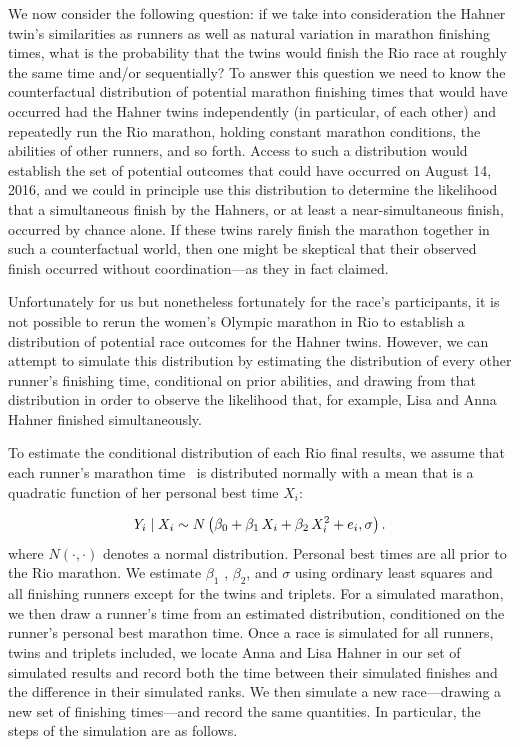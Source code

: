 \documentclass[12pt,titlepage]{article}
\begin{document}
We now consider the following question: if we take into consideration
the Hahner twin's similarities as runners as well as natural variation
in marathon finishing times, what is the probability that the twins
would finish the Rio race at roughly the same time and/or
sequentially?  To answer this question we need to know the
counterfactual distribution of potential marathon finishing times that
would have occurred had the Hahner twins independently (in particular,
of each other) and repeatedly run the Rio marathon, holding constant
marathon conditions, the abilities of other runners, and so forth.
Access to such a distribution would establish the set of potential
outcomes that could have occurred on August 14, 2016, and we could in
principle use this distribution to determine the likelihood that a
simultaneous finish by the Hahners, or at least a near-simultaneous
finish, occurred by chance alone.  If these twins rarely finish the
marathon together in such a counterfactual world, then one might be
skeptical that their observed finish occurred without
coordination---as they in fact claimed.

Unfortunately for us but nonetheless fortunately for the race's
participants, it is not possible to rerun the women's Olympic marathon
in Rio to establish a distribution of potential race outcomes for the
Hahner twins.  However, we can attempt to simulate this distribution
by estimating the distribution of every other runner's finishing time,
conditional on prior abilities, and drawing from that distribution in
order to observe the likelihood that, for example, Lisa and Anna
Hahner finished simultaneously.

To estimate the conditional distribution of each Rio final results, we
assume that each runner's marathon time \Yi\ is distributed normally
with a mean that is a quadratic function of her personal best time
$X_i$:

$$Y_i \mid X_i \sim N\left(\beta_0 + \beta_1\,X_{i} + \beta_2\,X^2_{i}  + e_i, \sigma\right).$$
where $N\left(\cdot,\cdot\right)$ denotes a normal distribution.
Personal best times are all prior to the Rio marathon.  We estimate
$\beta_1$ , $\beta_2$, and $\sigma$ using ordinary least squares and
all finishing runners except for the twins and triplets.  For a
simulated marathon, we then draw a runner's time from an estimated
distribution, conditioned on the runner's personal best marathon time.
Once a race is simulated for all runners, twins and triplets included,
we locate Anna and Lisa Hahner in our set of simulated results and
record both the time between their simulated finishes and the
difference in their simulated ranks.  We then simulate a new
race---drawing a new set of finishing times---and record the same
quantities.  In particular, the steps of the simulation are as
follows.
\end{document}
